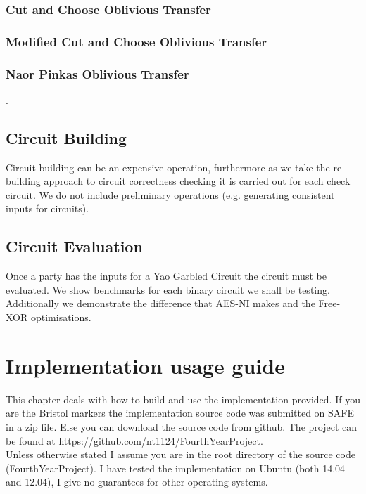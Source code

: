 \documentclass[ %
                    author={Nicholas Tutte},
                supervisor={Prof. Nigel Smart},
                    degree={MEng},
                     title={Secure Two Party Computation},
                  subtitle={A practical comparison of recent protocols},
                      type={Research - GG1K},
                      year={2015} ]{dissertation}
\begin{document}
\begin{appendices}
				\subsection{Cut and Choose Oblivious Transfer}

				\subsection{Modified Cut and Choose Oblivious Transfer}

				\subsection{Naor Pinkas Oblivious Transfer}

					.

			\section{Circuit Building}

				Circuit building can be an expensive operation, furthermore as we take the re-building approach to circuit correctness checking it is carried out for each check circuit. We do not include preliminary operations (e.g. generating consistent inputs for circuits).

			\section{Circuit Evaluation}

				Once a party has the inputs for a Yao Garbled Circuit the circuit must be evaluated. We show benchmarks for each binary circuit we shall be testing. Additionally we demonstrate the difference that AES-NI makes and the Free-XOR optimisations. 

		\chapter{Implementation usage guide}
			This chapter deals with how to build and use the implementation provided. If you are the Bristol markers the implementation source code was submitted on SAFE in a zip file. Else you can download the source code from github. The project can be found at \url{https://github.com/nt1124/FourthYearProject}.\\
			
			Unless otherwise stated I assume you are in the root directory of the source code (FourthYearProject). I have tested the implementation on Ubuntu (both 14.04 and 12.04), I give no guarantees for other operating systems.


\end{appendices}
\end{document}
